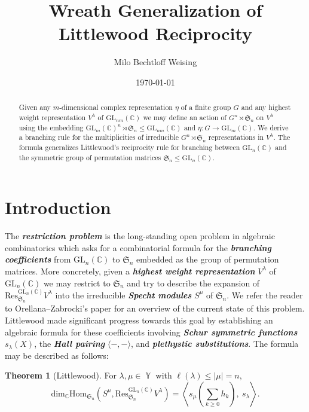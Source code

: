 \documentclass[12pt,reqno]{amsart}
\title{Wreath Generalization of Littlewood Reciprocity}
\author{Milo Bechtloff Weising}
\date{\today}
\theoremstyle{definition}
\newtheorem*{thm*}{Theorem}
\DeclareMathOperator{\Par}{\mathbb{Y}}
\begin{document}
\maketitle 

\begin{abstract}
    Given any $m$-dimensional complex representation $\eta$ of a finite group $G$ and any highest weight representation $V^{\lambda}$ of $\mathrm{GL}_{nm}(\mathbb{C})$ we may define an action of $G^n \rtimes \mathfrak{S}_n$ on $V^{\lambda}$ using the embedding $\mathrm{GL}_{m}(\mathbb{C})^n \rtimes \mathfrak{S}_n \leq \mathrm{GL}_{nm}(\mathbb{C})$ and $\eta: G \rightarrow \mathrm{GL}_m(\mathbb{C})$. We derive a branching rule for the multiplicities of irreducible $G^n \rtimes \mathfrak{S}_n$ representations in $V^{\lambda}.$ The formula generalizes Littlewood's reciprocity rule for branching between $\mathrm{GL}_n(\mathbb{C})$ and the symmetric group of permutation matrices $\mathfrak{S}_n \leq \mathrm{GL}_n(\mathbb{C}).$
  
\end{abstract}

\section{Introduction}

The \textit{\textbf{restriction problem}} is the long-standing open problem in algebraic combinatorics which asks for a combinatorial formula for the \textit{\textbf{branching coefficients}} from $\mathrm{GL}_n(\mathbb{C})$ to $\mathfrak{S}_n$ embedded as the group of permutation matrices. More concretely, given a \textit{\textbf{highest weight representation}} $V^{\lambda}$ of $\mathrm{GL}_n(\mathbb{C})$ we may restrict to $\mathfrak{S}_n$ and try to describe the expansion of $\mathrm{Res}^{\mathrm{GL}_n(\mathbb{C})}_{\mathfrak{S}_n} V^{\lambda}$ into the irreducible \textit{\textbf{Specht modules}} $S^{\mu}$ of $\mathfrak{S}_n.$ We refer the reader to Orellana--Zabrocki's paper \cite{OZ21} for an overview of the current state of this problem. Littlewood \cite{Littlewood58} made significant progress towards this goal by establishing an algebraic formula for these coefficients involving \textit{\textbf{Schur symmetric functions}} $s_{\lambda}(X)$, the \textit{\textbf{Hall pairing}} $\langle -, - \rangle$, and \textit{\textbf{plethystic substitutions}}. The formula may be described as follows:

\begin{thm*}[Littlewood]\cite{Littlewood58}
    For $\lambda,\mu \in \Par$ with $\ell(\lambda) \leq |\mu| = n$, 
    $$\mathrm{dim}_{\mathbb{C}} \mathrm{Hom}_{\mathfrak{S}_{n}}\left( S^{\mu}, \mathrm{Res}^{\mathrm{GL}_n(\mathbb{C})}_{\mathfrak{S}_n} V^{\lambda} \right) = \left\langle s_{\mu}\left( \sum_{k\geq 0} h_k \right), ~ s_{\lambda} \right\rangle.$$
\end{thm*}
\end{document}
